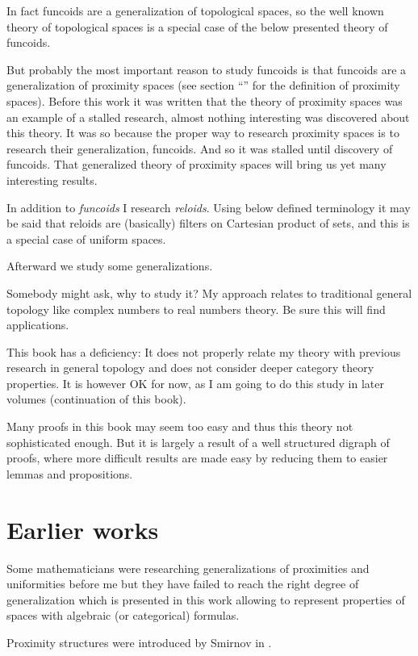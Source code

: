 In fact funcoids are a generalization of topological spaces, so the
well known theory of topological spaces is a special case of the below
presented theory of funcoids.

But probably the most important reason to study funcoids is that funcoids
are a generalization of proximity spaces (see section ``''
for the definition of proximity spaces). Before this work it was written
that the theory of proximity spaces was an example of a stalled research,
almost nothing interesting was discovered about this theory. It was
so because the proper way to research proximity spaces is to research
their generalization, funcoids. And so it was stalled until discovery
of funcoids. That generalized theory of proximity spaces will bring
us yet many interesting results.

In addition to \emph{funcoids} I research \emph{reloids}. Using below
defined terminology it may be said that reloids are (basically) filters
on Cartesian product of sets, and this is a special case of uniform
spaces.

Afterward we study some generalizations.

Somebody might ask, why to study it? My approach relates to traditional
general topology like complex numbers to real numbers theory. Be sure
this will find applications.

This book has a deficiency: It does not properly relate my theory
with previous research in general topology and does not consider deeper
category theory properties. It is however OK for now, as I am going
to do this study in later volumes (continuation of this book).

Many proofs in this book may seem too easy and thus this theory not
sophisticated enough. But it is largely a result of a well structured
digraph of proofs, where more difficult results are made easy by reducing
them to easier lemmas and propositions.


\section{Earlier works}

Some mathematicians were researching generalizations of proximities
and uniformities before me but they have failed to reach the right
degree of generalization which is presented in this work allowing
to represent properties of spaces with algebraic (or categorical)
formulas.

Proximity structures were introduced by Smirnov in \cite{geom-prox}.

